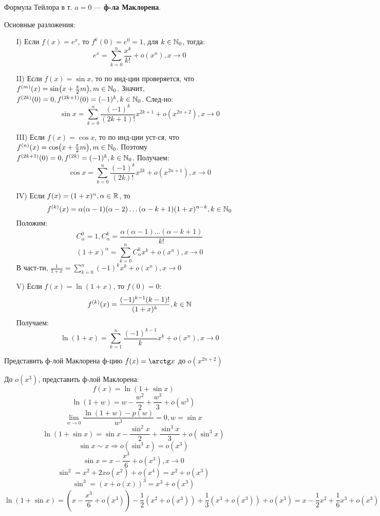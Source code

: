 \begin{definition}
Формула Тейлора в т. $a = 0$ --- \textbf{ф-ла Маклорена}.
\end{definition}
Основные разложения:
\begin{itemize}
  \item [I) ] Если $f(x) = e^{x}$, то $f^{k}(0) = e^{0} = 1$, для $k \in \mathbb{N}_0$, тогда:
    \[
    e^{x} = \sum_{k = 0}^{n} \frac{x^{k}}{k!} + o(x^{n}), x \rightarrow 0
    \]
  \item [II) ] Если $f(x) = \sin x$, то по инд-ции проверяется, что $f^{(m)}(x) = \sin(x + \frac{\pi}{2}m), m \in \mathbb{N}_0$. Значит, $f^{(2k)}(0) = 0, f^{(2k + 1)}(0) = (-1)^{k}, k \in \mathbb{N}_0$. След-но:
    \[
    \sin x = \sum_{k = 0}^{n} \frac{(-1)^{k}}{(2k + 1)!} x^{2k + 1} + o(x^{2n + 2}), x \rightarrow 0
    \]
  \item [III)] Если $f(x) = \cos x$, то по инд-ции уст-ся, что $f^{(n)}(x) = \cos(x + \frac{\pi}{2}m), m \in \mathbb{N}_0$. Поэтому $f^{(2k + 1)}(0) = 0, f^{(2k)} = (-1)^{k}, k \in \mathbb{N}_0$. Получаем:
    \[
    \cos x = \sum_{k = 0}^{n} \frac{(-1)^{k}}{(2k)!} x^{2k} + o(x^{2n + 1}), x \rightarrow 0
    \]
  \item [IV)] Если $f(x) = (1 + x)^{\alpha}, \alpha \in \mathbb{R}$, то
    \[
      f^{(k)}(x) = \alpha(\alpha - 1)(\alpha - 2)\ldots(\alpha - k + 1)(1 + x)^{\alpha - k}, k \in \mathbb{N}_0
    \]
    Положим:
    \[
    C_{\alpha}^{0} = 1, C_{\alpha}^{k} = \frac{\alpha(\alpha - 1)\ldots(\alpha - k + 1)}{k!}
    \]
    \[
      (1 + x)^{\alpha} = \sum_{k = 0}^{n} C_{\alpha}^{k} x^{k} + o(x^{n}), x \rightarrow 0
    \]
    В част-ти, $\frac{1}{1 + x} = \sum_{k = 0}^{n} (-1)^{k}x^{k} + o(x^{n}), x \rightarrow 0$
  \item [V)] Если $f(x) = \ln(1 + x)$, то $f(0) = 0$:
    \[
    f^{(k)}(x) = \frac{(-1)^{k - 1} (k - 1)!}{(1 + x)^{k}}, k \in \mathbb{N}
    \]
    Получаем:
    \[
    \ln(1 + x) = \sum_{k = 1}^{n} \frac{(-1)^{k - 1}}{k} x^{k} + o(x^{n}), x \rightarrow 0
    \]
\end{itemize}
\begin{task}
Представить ф-лой Маклорена ф-цию $f(x) = \arctg x$ до $o(x^{2n + 2})$
\end{task}
\begin{task}
  До $o(x^{3})$, представить ф-лой Маклорена:
\[
f(x) = \ln(1 + \sin x)
\]
\[
  \ln(1 + w) = w - \frac{w^{2}}{2} + \frac{w^{3}}{3} + o(w^{3})
\]
\[
  \lim_{w\to 0} \frac{\ln(1 + w) - p(w)}{w^{3}} = 0, w = \sin x
\]
\[
  \ln(1 + \sin x) = \sin x - \frac{\sin^{2} x}{2} + \frac{\sin^{3} x}{3} + o(\sin^{3} x)
\]
\[
  \sin x \sim x \Rightarrow o(\sin^{3} x) = o(x^{3})
\]
\[
  \sin x = x - \frac{x^{3}}{6} + o(x^{3}), x \rightarrow 0
\]
\[
  \sin^{2} = x^{2} + 2x o(x^{2}) + o(x^{4}) = x^{2} + o(x^{3})
\]
  \[
  \sin^{3} = (x + o(x))^{3} = x^{3} + o(x^{3})
  \]
  \[
  \ln(1 + \sin x) = (x - \frac{x^{3}}{6} + o(x^{3})) - \frac{1}{2}(x^{2} + o(x^{3})) + \frac{1}{3} (x^{3} + o(x^{3})) + o(x^{3}) = x - \frac{1}{2}x^{2} + \frac{1}{6}x^{3} + o(x^{3})
  \]
\end{task}
